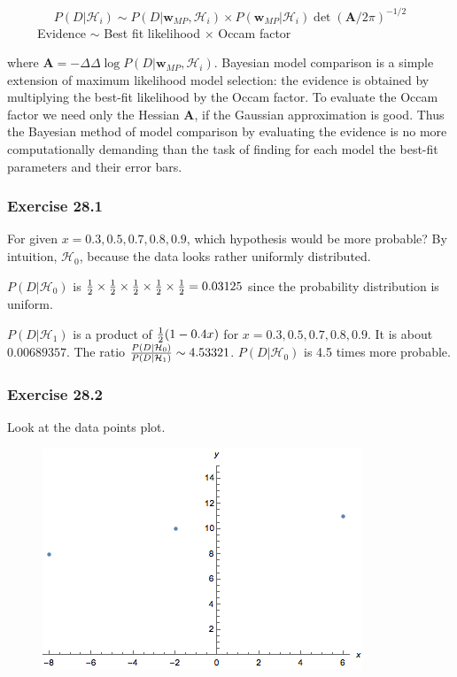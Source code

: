 \documentclass[a4paper,11pt]{article}
\newcommand{\vect}[1]{\boldsymbol{\mathbf{#1}}}
\numberwithin{equation}{section}
\begin{document}
{$$
P(D|\mathcal{H}_i) \sim P(D|\vect w_{MP}, \mathcal{H}_i) \times P(\vect w_{MP}| \mathcal{H}_i) \det (\vect A/2\pi)^{-1/2}
$$ 
$~~~~~~~~~~~$Evidence $\sim$ Best fit likelihood $\times$ Occam factor

where $\vect A = -\Delta \Delta \log P(D|\vect w_{MP}, \mathcal{H}_i)$. Bayesian model comparison is a simple extension of maximum likelihood model selection: the evidence is obtained by multiplying the best-fit likelihood by the Occam factor. To evaluate the Occam factor we need only the Hessian $\vect A$, if the Gaussian
approximation is good. Thus the Bayesian method of model comparison by
evaluating the evidence is no more computationally demanding than the task
of finding for each model the best-fit parameters and their error bars.


\subsubsection{Exercise 28.1}

For given $x= 0.3,0.5,0.7,0.8,0.9$, which hypothesis would be more probable? By intuition, $\mathcal{H}_0$, because the data looks rather uniformly distributed. 

$P(D|\mathcal{H}_0)$ is ${1 \over 2}\times {1 \over 2} \times{1 \over 2} \times{1 \over 2}\times {1 \over 2}  = 0.03125$ since the probability distribution is uniform. 

$P(D|\mathcal{H}_1)$ is a product of ${1 \over 2} (1- 0.4 x)$ for $x= 0.3,0.5,0.7,0.8,0.9$. It is about $0.00689357$. The ratio ${P(D|\mathcal{H}_0) \over P(D|\mathcal{H}_1)} \sim 4.53321$. $P(D|\mathcal{H}_0)$ is 4.5 times more probable. 

\subsubsection{Exercise 28.2}

Look at the data points plot. 

\begin{figure}[h!]
\centerline{
\includegraphics[width=.7\textwidth]{datapointsExercise28-2.png}}
 \caption[The plot of exercise 28.2-1]{\label{Exercise28-2-1} \small }
\end{figure}

}
\end{document}
